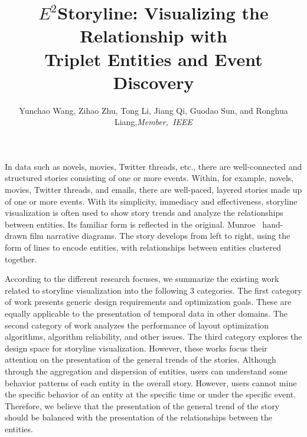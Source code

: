 \documentclass[review,journal]{vgtc}         %
\title{$E^2$Storyline: Visualizing the Relationship with\\ Triplet Entities and Event Discovery}
\author{Yunchao Wang, Zihao Zhu, Tong Li, Jiang Qi, Guodao Sun, and Ronghua Liang,\textit{Member,~IEEE}}
\begin{document}


\maketitle
In data such as novels, movies, Twitter threads, etc., there are well-connected and structured stories consisting of one or more events. Within, for example, novels, movies, Twitter threads, and emails, there are well-paced, layered stories made up of one or more events.
With its simplicity, immediacy and effectiveness, storyline visualization is often used to show story trends and analyze the relationships between entities. Its familiar form is reflected in the original. 
Munroe~\cite{munroe_movie_nodate} hand-drawn film narrative diagrams. The story develops from left to right, using the form of lines to encode entities, with relationships between entities clustered together.

According to the different research focuses, we summarize the existing work related to storyline visualization into the following 3 categories. The first category of work presents generic design requirements and optimization goals. These are equally applicable to the presentation of temporal data in other domains. The second category of work analyzes the performance of layout optimization algorithms, algorithm reliability, and other issues. The third category explores the design space for storyline visualization. However, these works focus their attention on the presentation of the general trends of the stories. Although through the aggregation and dispersion of entities, users can understand some behavior patterns of each entity in the overall story.
However, users cannot mine the specific behavior of an entity at the specific time or under the specific event. Therefore, we believe that the presentation of the general trend of the story should be balanced with the presentation of the relationships between the entities.
\end{document}
